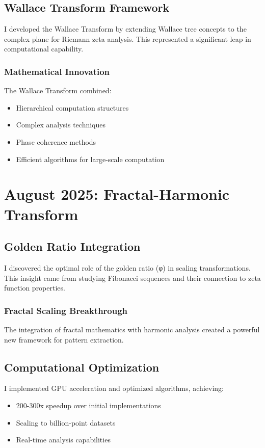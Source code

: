 \documentclass[12pt]{article}
\begin{document}
\subsection{Wallace Transform Framework}

I developed the Wallace Transform by extending Wallace tree concepts to the complex plane for Riemann zeta analysis. This represented a significant leap in computational capability.

\subsubsection{Mathematical Innovation}

The Wallace Transform combined:
\begin{itemize}
    \item Hierarchical computation structures
    \item Complex analysis techniques
    \item Phase coherence methods
    \item Efficient algorithms for large-scale computation
\end{itemize}

\section{August 2025: Fractal-Harmonic Transform}

\subsection{Golden Ratio Integration}

I discovered the optimal role of the golden ratio (φ) in scaling transformations. This insight came from studying Fibonacci sequences and their connection to zeta function properties.

\subsubsection{Fractal Scaling Breakthrough}

The integration of fractal mathematics with harmonic analysis created a powerful new framework for pattern extraction.

\subsection{Computational Optimization}

I implemented GPU acceleration and optimized algorithms, achieving:
\begin{itemize}
    \item 200-300x speedup over initial implementations
    \item Scaling to billion-point datasets
    \item Real-time analysis capabilities
\end{itemize}
\end{document}
